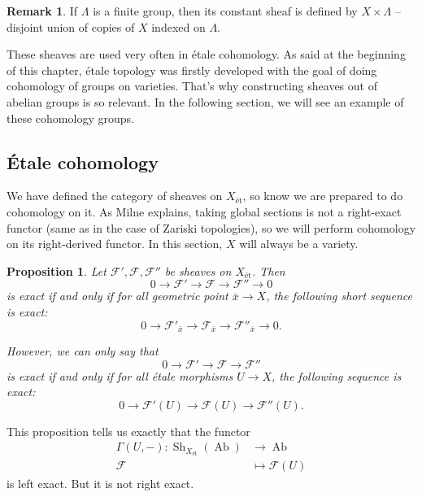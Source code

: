\documentclass{report}
\DeclareMathOperator{\Sh}{Sh}
\DeclareMathOperator{\Ab}{Ab}
\newtheorem{proposition}[equation]{Proposition}
\theoremstyle{definition}
\newtheorem{remark}[equation]{Remark}
\begin{document}
\begin{remark}
If $\Lambda$ is a finite group, then its constant sheaf is defined by $X\times\Lambda$ -- disjoint union of copies of $X$ indexed on $\Lambda$.
\end{remark}

These sheaves are used very often in \'{e}tale cohomology. As said at the beginning of this chapter, \'{e}tale topology was firstly developed with the goal of doing cohomology of groups on varieties. That's why constructing sheaves out of abelian groups is so relevant. In the following section, we will see an example of these cohomology groups.

%

\subsection{\'{E}tale cohomology}

We have defined the category of sheaves on $X_{\text{\'{e}t}}$, so know we are prepared to do cohomology on it. As Milne \cite[Section~I.7]{milne2013lectures} explains, taking global sections is not a right-exact functor (same as in the case of Zariski topologies), so we will perform cohomology on its right-derived functor. In this section, $X$ will always be a variety.

\begin{proposition}
Let $\mathcal{F}',\mathcal{F},\mathcal{F}''$ be sheaves on $X_{\text{\'{e}t}}$. Then
\[0\longrightarrow\mathcal{F}'\longrightarrow\mathcal{F}\longrightarrow\mathcal{F}''\longrightarrow0\]
is exact if and only if for all geometric point $\bar{x}\rightarrow X$, the following short sequence is exact:
\[0\longrightarrow\mathcal{F}'_{\bar{x}}\longrightarrow\mathcal{F}_{\bar{x}}\longrightarrow\mathcal{F}''_{\bar{x}}\longrightarrow0.\]

However, we can only say that
\[0\longrightarrow\mathcal{F}'\longrightarrow\mathcal{F}\longrightarrow\mathcal{F}''\]
is exact if and only if for all \'{e}tale morphisms $U\rightarrow X$, the following sequence is exact:
\[0\longrightarrow\mathcal{F}'(U)\longrightarrow\mathcal{F}(U)\longrightarrow\mathcal{F}''(U).\]
\end{proposition}

This proposition tells us exactly that the functor
\begin{align*}
\Gamma(U,-):\Sh_{X_{\text{\'{e}t}}}(\Ab)&\longrightarrow\Ab\\
\mathcal{F}&\longmapsto\mathcal{F}(U)
\end{align*}
is left exact. But it is not right exact.
\end{document}
